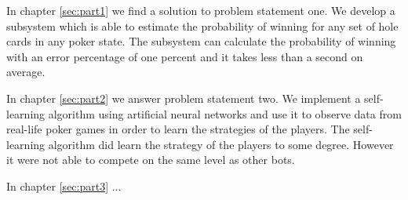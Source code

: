 In chapter \ref{sec:part1} we find a solution to problem statement one. We develop a subsystem which is able to estimate the probability of winning for any set of hole cards in any poker state. The subsystem can calculate the probability of winning with an error percentage of one percent and it takes less than a second on average.

In chapter \ref{sec:part2} we answer problem statement two. We implement a self-learning algorithm using artificial neural networks and use it to observe data from real-life poker games in order to learn the strategies of the players. The self-learning algorithm did learn the strategy of the players to some degree. However it were not able to compete on the same level as other bots.

In chapter \ref{sec:part3} ...
